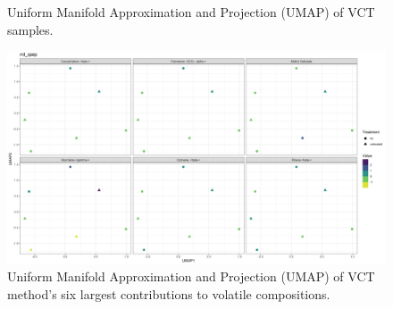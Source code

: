 \documentclass[12pt,final,CPage]{ufthesis}
\begin{document}
{\begin{figure}
{  }

  \caption{Uniform Manifold Approximation and Projection (UMAP) of VCT samples.}\label{fig:qsep-vocs-umap}
  \end{figure}
  \begin{figure}

  {\centering \includegraphics[width=1\linewidth]{figure/rrv_volatiles_umap_chems_rrd_qsep} 

  }

  \caption{Uniform Manifold Approximation and Projection (UMAP) of VCT method's six largest contributions to volatile compositions.}\label{fig:qsep-vocs-umap-chems}
  \end{figure}
  \begin{table}


\end{table}}
\end{document}
